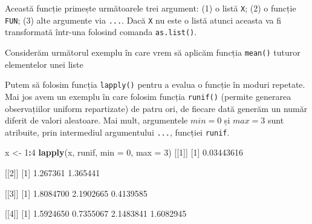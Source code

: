 \documentclass[]{article}
\newenvironment{Shaded}{\begin{snugshade}}{\end{snugshade}}
\newcommand{\DataTypeTok}[1]{\textcolor[rgb]{0.13,0.29,0.53}{#1}}
\newcommand{\DecValTok}[1]{\textcolor[rgb]{0.00,0.00,0.81}{#1}}
\newcommand{\FloatTok}[1]{\textcolor[rgb]{0.00,0.00,0.81}{#1}}
\newcommand{\KeywordTok}[1]{\textcolor[rgb]{0.13,0.29,0.53}{\textbf{#1}}}
\newcommand{\NormalTok}[1]{#1}
\newcommand{\OperatorTok}[1]{\textcolor[rgb]{0.81,0.36,0.00}{\textbf{#1}}}
\newcommand{\StringTok}[1]{\textcolor[rgb]{0.31,0.60,0.02}{#1}}
\begin{document}
Această funcție primește următoarele trei argument: (1) o listă
\texttt{X}; (2) o funcție \texttt{FUN}; (3) alte argumente via
\texttt{...}. Dacă \texttt{X} nu este o listă atunci aceasta va fi
transformată într-una folosind comanda \texttt{as.list()}.

Considerăm următorul exemplu în care vrem să aplicăm funcția
\texttt{mean()} tuturor elementelor unei liste

\begin{Shaded}
\end{Shaded}

Putem să folosim funcția \texttt{lapply()} pentru a evalua o funcție în
moduri repetate. Mai jos avem un exemplu în care folosim funcția
\texttt{runif()} (permite generarea observațiilor uniform repartizate)
de patru ori, de fiecare dată generăm un număr diferit de valori
aleatoare. Mai mult, argumentele \(min=0\) și \(max=3\) sunt atribuite,
prin intermediul argumentului \texttt{...}, funcției \texttt{runif}.

\begin{Shaded}
\begin{Highlighting}[]
\NormalTok{x <-}\StringTok{ }\DecValTok{1}\OperatorTok{:}\DecValTok{4}
\KeywordTok{lapply}\NormalTok{(x, runif, }\DataTypeTok{min =} \DecValTok{0}\NormalTok{, }\DataTypeTok{max =} \DecValTok{3}\NormalTok{)}
\NormalTok{[[}\DecValTok{1}\NormalTok{]]}
\NormalTok{[}\DecValTok{1}\NormalTok{] }\FloatTok{0.03443616}

\NormalTok{[[}\DecValTok{2}\NormalTok{]]}
\NormalTok{[}\DecValTok{1}\NormalTok{] }\FloatTok{1.267361} \FloatTok{1.365441}

\NormalTok{[[}\DecValTok{3}\NormalTok{]]}
\NormalTok{[}\DecValTok{1}\NormalTok{] }\FloatTok{1.8084700} \FloatTok{2.1902665} \FloatTok{0.4139585}

\NormalTok{[[}\DecValTok{4}\NormalTok{]]}
\NormalTok{[}\DecValTok{1}\NormalTok{] }\FloatTok{1.5924650} \FloatTok{0.7355067} \FloatTok{2.1483841} \FloatTok{1.6082945}
\end{Highlighting}
\end{Shaded}
\end{document}

